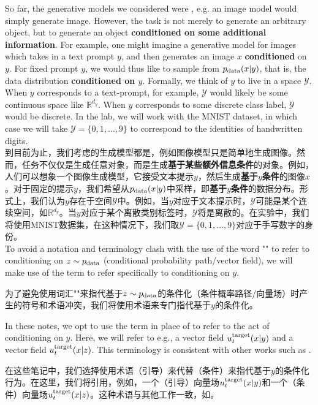 So far, the generative models we considered were , e.g. an image model would simply generate  image. However, the task is not merely to generate an arbitrary object, but to generate an object \textbf{\sffamily conditioned on some additional information}. For example, one might imagine a generative model for images which takes in a text prompt $y$, and then generates an image $x$ \textbf{\sffamily conditioned} on $y$. For fixed prompt $y$, we would thus like to sample from $p_{\rm{data}}(x|y)$, that is, the data distribution \textbf{\sffamily conditioned on $y$}. Formally, we think of $y$ to live in a space $\mathcal{Y}$. When $y$ corresponds to a text-prompt, for example, $\mathcal{Y}$ would likely be some continuous space like $\mathbb{R}^{d_y}$. When $y$ corresponds to some discrete class label, $\mathcal{Y}$ would be discrete. In the lab, we will work with the MNIST dataset, in which case we will take $\mathcal{Y} = \{0,1,\dots,9\}$ to correspond to the identities of handwritten digits.\\

到目前为止，我们考虑的生成模型都是，例如图像模型只是简单地生成图像。然而，任务不仅仅是生成任意对象，而是生成\textbf{\sffamily 基于某些额外信息条件}的对象。例如，人们可以想象一个图像生成模型，它接受文本提示$y$，然后生成\textbf{\sffamily 基于}$y$\textbf{\sffamily 条件}的图像$x$。对于固定的提示$y$，我们希望从$p_{\rm{data}}(x|y)$中采样，即\textbf{\sffamily 基于$y$条件}的数据分布。形式上，我们认为$y$存在于空间$\mathcal{Y}$中。例如，当$y$对应于文本提示时，$\mathcal{Y}$可能是某个连续空间，如$\mathbb{R}^{d_y}$。当$y$对应于某个离散类别标签时，$\mathcal{Y}$将是离散的。在实验中，我们将使用MNIST数据集，在这种情况下，我们取$\mathcal{Y} = \{0,1,\dots,9\}$对应于手写数字的身份。\\

To avoid a notation and terminology clash with the use of the word "" to refer to conditioning on $z \sim p_{\rm{data}}$ (conditional probability path/vector field), we will make use of the term  to refer specifically to conditioning on $y$.

为了避免使用词汇""来指代基于$z \sim p_{\rm{data}}$的条件化（条件概率路径/向量场）时产生的符号和术语冲突，我们将使用术语来专门指代基于$y$的条件化。
\begin{remarkbox}
    In these notes, we opt to use the term  in place of  to refer to the act of conditioning on $y$. Here, we will refer to e.g., a  vector field $u^{\text{target}}_t(x|y)$ and a  vector field $u^{\text{target}}_t(x|z)$. This terminology is consistent with other works such as \cite{lipman2024flow}. 
\end{remarkbox}
\begin{remarkbox}[引导 vs. 条件 术语]
    在这些笔记中，我们选择使用术语（引导）来代替（条件）来指代基于$y$的条件化行为。在这里，我们将引用，例如，一个（引导）向量场$u^{\text{target}}_t(x|y)$和一个（条件）向量场$u^{\text{target}}_t(x|z)$。这种术语与其他工作一致，如\cite{lipman2024flow}。
\end{remarkbox}

